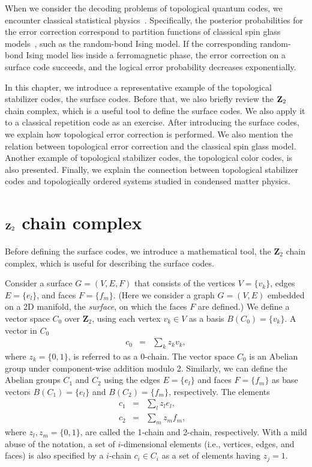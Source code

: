 When we consider the decoding problems of topological quantum codes, we encounter classical statistical physics~\cite{Dennis}.
Specifically, the posterior probabilities for the error correction correspond to partition functions of classical spin glass models~\cite{Dennis}, such as the random-bond Ising model.
If the corresponding random-bond Ising model lies inside a ferromagnetic phase, the error correction on a surface code succeeds, and the logical error probability decreases exponentially.

In this chapter, we introduce a representative example of the topological stabilizer codes, the surface codes. 
Before that, we also briefly review the ${\bf Z}_2$ chain complex, which is a useful tool to define the surface codes. 
We also apply it to a classical repetition code as an exercise.
After introducing the surface codes, we explain how topological error correction is performed.
We also mention the relation between topological error correction and the classical spin glass model.
Another example of topological stabilizer codes, the topological color codes, is also presented.
Finally, we explain the connection between topological stabilizer codes and topologically ordered systems studied in condensed matter physics.




\section{${\bf Z}_2$ chain complex}
\label{sec:chain_complex}
Before defining the surface codes, we introduce a mathematical tool, the $\mathbf{Z}_2$ chain complex, which is useful for describing the surface codes. 

Consider a surface $G=(V,E,F)$ that consists of the vertices $V=\{v_k\}$, edges $E=\{e_l\}$, and faces $F=\{f_m\}$.
(Here we consider a graph $G=(V,E)$ embedded on a 2D manifold, the {\it surface}, on which the faces $F$ are defined.)
We define a vector space $C_0$ over $\mathbf{Z}_2$, using each vertex $v_k \in V$ as a basis $B(C_0)=\{ v_k\}$.
A vector in $C_0$
\begin{eqnarray}
c_0 &=& \sum _k z_k v_k, 
\end{eqnarray}
where $z_k =\{ 0, 1\}$, is referred to as a 0-chain.
The vector space $C_0$ is an Abelian group under component-wise addition modulo 2.
Similarly, we can define the Abelian groups $C_1$ and $C_2$ using the edges $E=\{e_l\}$ and faces $F=\{ f_m \}$ as base vectors $B(C_1)=\{ e_l\}$ and $B(C_2)=\{ f_m\}$, respectively.
The elements
\begin{eqnarray}
c_1 &=& \sum _l z_l e_l, \;\;\;
\\
c_2 &=& \sum _m z_m f_m, \;\;\;
\end{eqnarray}
where $z_l, z_m=\{ 0,1\}$, are called the 1-chain and 2-chain, respectively.
With a mild abuse of the notation, a set of $i$-dimensional elements (i.e., vertices, edges, and faces) is also specified by a $i$-chain $c_i \in C_i$ as a set of elements having $z_j=1$.

